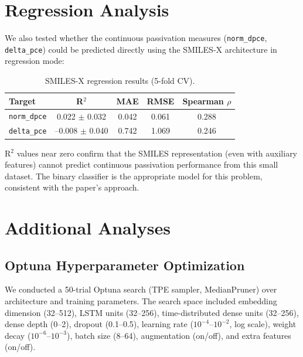 \documentclass[11pt,a4paper]{article}
\begin{document}
\section{Regression Analysis}

We also tested whether the continuous passivation measures (\texttt{norm\_dpce}, \texttt{delta\_pce}) could be predicted directly using the SMILES-X architecture in regression mode:

\begin{table}[H]
\centering
\caption{SMILES-X regression results (5-fold CV).}
\label{tab:regression}
\begin{tabular}{lcccc}
\toprule
Target & R$^2$ & MAE & RMSE & Spearman $\rho$ \\
\midrule
\texttt{norm\_dpce} & 0.022 $\pm$ 0.032 & 0.042 & 0.061 & 0.288 \\
\texttt{delta\_pce} & --0.008 $\pm$ 0.040 & 0.742 & 1.069 & 0.246 \\
\bottomrule
\end{tabular}
\end{table}

R$^2$ values near zero confirm that the SMILES representation (even with auxiliary features) cannot predict continuous passivation performance from this small dataset. The binary classifier is the appropriate model for this problem, consistent with the paper's approach.

\section{Additional Analyses}

\subsection{Optuna Hyperparameter Optimization}

We conducted a 50-trial Optuna search (TPE sampler, MedianPruner) over architecture and training parameters. The search space included embedding dimension (32--512), LSTM units (32--256), time-distributed dense units (32--256), dense depth (0--2), dropout (0.1--0.5), learning rate ($10^{-4}$--$10^{-2}$, log scale), weight decay ($10^{-6}$--$10^{-3}$), batch size (8--64), augmentation (on/off), and extra features (on/off).
\end{document}
